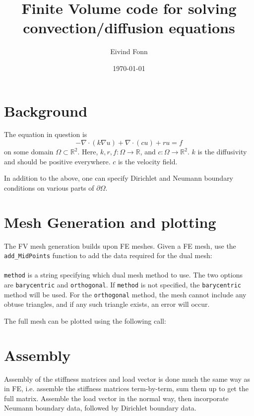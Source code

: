 \documentclass[a4paper,10pt]{article}
\title{Finite Volume code for solving convection/diffusion equations}
\author{Eivind Fonn}
\date{\today}
\begin{document}
\maketitle


\section{Background}

The equation in question is
\[ -\nabla\cdot(k\nabla u) + \nabla\cdot(cu) + ru = f \]
on some domain $\Omega\subset\mathbb{R}^2$. Here, $k,r,f:\Omega\to\mathbb{R}$,
and $c:\Omega\to\mathbb{R}^2$. $k$ is the diffusivity and should be positive 
everywhere. $c$ is the velocity field.

In addition to the above, one can specify Dirichlet and Neumann boundary
conditions on various parts of $\partial\Omega$.

\section{Mesh Generation and plotting}

The FV mesh generation builds upon FE meshes. Given a FE mesh, use the
{\tt add\_MidPoints} function to add the data required for the dual mesh: \\

 \\

{\tt method} is a string specifying which dual mesh method to use. The two
options are {\tt barycentric} and {\tt orthogonal}. If {\tt method}
is not specified, the {\tt barycentric} method will be used. For the
{\tt orthogonal} method, the mesh cannot include any obtuse triangles, and
if any such triangle exists, an error will occur.

The full mesh can be plotted using the following call: \\


\section{Assembly}

Assembly of the stiffness matrices and load vector is done much the same way
as in FE, i.e. assemble the stiffness matrices term-by-term, sum them up to get
the full matrix. Assemble the load vector in the normal way, then incorporate
Neumann boundary data, followed by Dirichlet boundary data.
\end{document}
